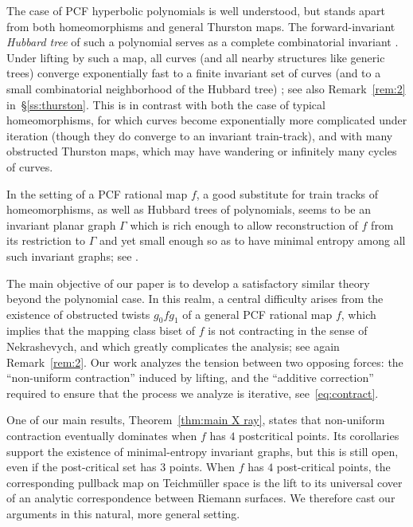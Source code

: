 \documentclass{amsart}
\theoremstyle{definition}
\theoremstyle{remark}
\begin{document}
The case of PCF hyperbolic polynomials is well understood, but stands apart from both homeomorphisms and general Thurston maps.  The forward-invariant \emph{Hubbard tree} of such a polynomial serves as a complete combinatorial invariant \cite{MR2650982}.  Under lifting by such a map, all curves (and all nearby structures like generic trees) converge exponentially fast to a finite invariant set of curves (and to a small combinatorial neighborhood of the Hubbard tree) \cite{MR4510015}; see also Remark~\eqref{rem:2} in~\S\ref{ss:thurston}. This is in contrast with both the case of typical homeomorphisms, for which curves become exponentially more complicated under iteration (though they do converge to an invariant train-track), and with many obstructed Thurston maps, which may have wandering or infinitely many cycles of curves.

In the setting of a PCF rational map $f$, a good substitute for train tracks of homeomorphisms, as well as Hubbard trees of polynomials, seems to be an invariant planar graph $\Gamma$ which is rich enough to allow reconstruction of $f$ from its restriction to $\Gamma$ and yet small enough so as to have minimal entropy among all such invariant graphs; see \cite{MR4423808, MR3774834, cui2024invariantgraphsjuliasets}.

The main objective of our paper is to develop a satisfactory similar theory beyond the polynomial case.  In this realm,  a central difficulty arises from the existence of obstructed twists $g_0fg_1$ of a general PCF rational map $f$, which implies that the mapping class biset of $f$ is not contracting in the sense of Nekrashevych, and which greatly complicates the analysis; see again Remark~\eqref{rem:2}.  Our work analyzes the tension between two opposing forces: the ``non-uniform contraction'' induced by lifting, and the ``additive correction'' required to ensure that the process we analyze is iterative, see~\eqref{eq:contract}. 

One of our main results, Theorem~\ref{thm:main X ray}, states that non-uniform contraction eventually dominates when $f$ has $4$ postcritical points. Its corollaries support the existence of minimal-entropy invariant graphs, but this is still open, even if the post-critical set has $3$ points. When $f$ has $4$ post-critical points, the corresponding pullback map on Teichm\"uller space is the lift to its universal cover of an analytic correspondence between Riemann surfaces. We therefore cast our arguments in this natural, more general setting.
\end{document}
